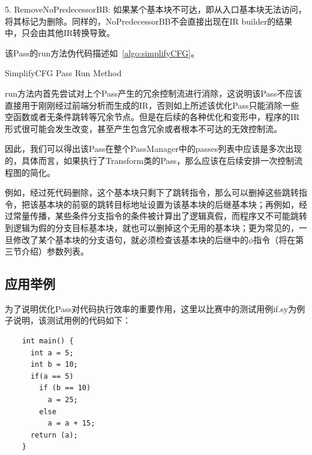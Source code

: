 5. RemoveNoPredecessorBB: 如果某个基本块不可达，即从入口基本块无法访问，将其标记为删除。同样的，NoPredecessorBB不会直接出现在IR builder的结果中，只会由其他IR转换导致。


该Pass的run方法伪代码描述如~\ref{algo:simplifyCFG}。

\begin{algorithm}[htb]
  \small
  \SetAlgoLined

  \caption{SimplifyCFG Pass Run Method}
  \label{algo:simplifyCFG}
\end{algorithm}

run方法内首先尝试对上个Pass产生的冗余控制流进行消除，这说明该Pass不应该直接用于刚刚经过前端分析而生成的IR，否则如上所述该优化Pass只能消除一些空函数或者无条件跳转等冗余节点。但是在后续的各种优化和变形中，程序的IR形式很可能会发生改变，甚至产生包含冗余或者根本不可达的无效控制流。

因此，我们可以得出该Pass在整个PassManager中的passes列表中应该是多次出现的，具体而言，如果执行了Transform类的Pass，那么应该在后续安排一次控制流程图的简化。

例如，经过死代码删除，这个基本块只剩下了跳转指令，那么可以删掉这些跳转指令，把该基本块的前驱的跳转目标地址设置为该基本块的后继基本块；再例如，经过常量传播，某些条件分支指令的条件被计算出了逻辑真假，而程序又不可能跳转到逻辑为假的分支目标基本块，就也可以删掉这个无用的基本块；更为常见的，一旦修改了某个基本块的分支语句，就必须检查该基本块的后继中的$\phi$指令（将在第三节介绍）参数列表。



\subsection{应用举例}

为了说明优化Pass对代码执行效率的重要作用，这里以比赛中的测试用例if.sy为例子说明，该测试用例的代码如下：

\begin{verbatim}
    int main() {
      int a = 5;
      int b = 10;
      if(a == 5)
        if (b == 10) 
          a = 25;
        else 
          a = a + 15;
      return (a);
    }
\end{verbatim}

